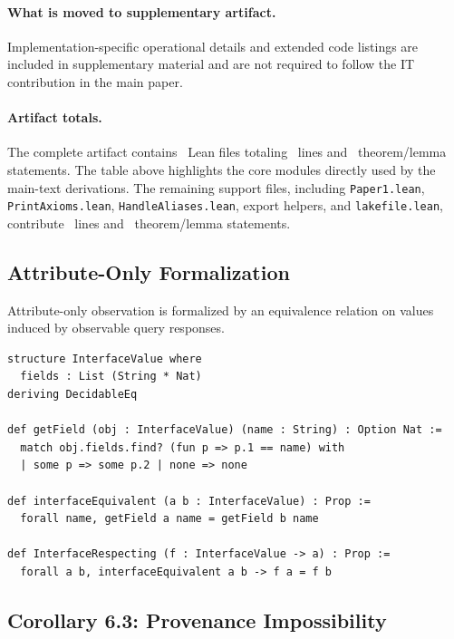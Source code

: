 \paragraph{What is moved to supplementary artifact.}
Implementation-specific operational details and extended code listings are included in supplementary material and are not required to follow the IT contribution in the main paper.

\paragraph{Artifact totals.}
The complete artifact contains \LeanTotalFiles\ Lean files totaling \LeanTotalLines\ lines and \LeanTotalTheorems\ theorem/lemma statements. The table above highlights the core modules directly used by the main-text derivations. The remaining support files, including \nolinkurl{Paper1.lean}, \nolinkurl{PrintAxioms.lean}, \nolinkurl{HandleAliases.lean}, export helpers, and \nolinkurl{lakefile.lean}, contribute \LeanLinesSupportFiles\ lines and \LeanTheoremsSupportFiles\ theorem/lemma statements.

\subsection{Attribute-Only Formalization}\label{interface-only-formalization}

Attribute-only observation is formalized by an equivalence relation on values induced by observable query responses.

\begin{lstlisting}[style=lean]
structure InterfaceValue where
  fields : List (String * Nat)
deriving DecidableEq

def getField (obj : InterfaceValue) (name : String) : Option Nat :=
  match obj.fields.find? (fun p => p.1 == name) with
  | some p => some p.2 | none => none

def interfaceEquivalent (a b : InterfaceValue) : Prop :=
  forall name, getField a name = getField b name

def InterfaceRespecting (f : InterfaceValue -> a) : Prop :=
  forall a b, interfaceEquivalent a b -> f a = f b
\end{lstlisting}

\subsection{Corollary 6.3: Provenance Impossibility}\label{corollary-6.3-interface-only-cannot-provide-provenance}

